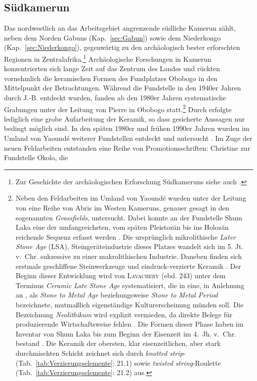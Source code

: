 \subsection{Südkamerun}\label{sec:Kamerun}

Das nordwestlich an das Arbeitsgebiet angrenzende südliche Kamerun zählt, neben dem Norden Gabuns (Kap.~\ref{sec:Gabun}) sowie dem Niederkongo (Kap.~\ref{sec:Niederkongo}), gegenwärtig zu den archäologisch bester erforschten Regionen in Zentralafrika.\footnote{Zur Geschichte der archäologischen Erforschung Südkameruns siehe auch \textcite[7--9]{Seidensticker.2010b}.} Archäologische Forschungen in Kamerun konzentrierten sich lange Zeit auf das Zentrum des Landes und rückten vornehmlich die keramischen Formen des Fundplatzes Obobogo in den Mittelpunkt der Betrachtungen. Während die Fundstelle in den 1940er Jahren durch \mbox{J.-B.} \textcites{Jauze.1944}{Jauze.1944b}{Jauze.1948} entdeckt wurden, fanden ab den 1980er Jahren systematische Grabungen unter der Leitung von \mbox{Pierre} \textcites{Maret.1980}{Maret.1982} in Obobogo statt.\footnote{Neben den Feldarbeiten im Umland von Yaoundé wurden unter der Leitung von \textcites{deMaret.1995}{Maret.1996} eine Reihe von Abris im Westen Kameruns, genauer gesagt in den sogenannten \textit{Grassfields}, untersucht. Dabei konnte an der Fundstelle Shum Laka eine der umfangreichsten, vom späten Pleistozän bis ins Holozän reichende Sequenz erfasst werden \parencites{Asombang.1988}{Asombang.1992}{deMaret.1995}{Maret.1996}{Lavachery.1996}{Moeyersons.1996}{Cornelissen.1996}{Cornelissen.2003}. Die ursprünglich mikrolithische \textit{Later Stone Age} (LSA), Steingeräteindustrie dieses Platzes wandelt sich im 5. Jt. v.~Chr. sukzessive zu einer makrolithischen Industrie. Daneben finden sich erstmals geschliffene Steinwerkzeuge und eindruck-verzierte Keramik \parencite[225, 243]{Lavachery.2001}. Der Beginn dieser Entwicklung wird von \textsc{Lavachery} (ebd. 243) unter dem Terminus \textit{Ceramic Late Stone Age} systematisiert, die in eine, in Anlehnung an \textcite{McIntosh.1988}, als \textit{Stone to Metal Age} \parencite[SMA;][213]{Lavachery.2001} beziehungsweise \textit{Stone to Metal Period} \parencite[SMP;][279]{Maret.1996} bezeichnete, mutmaßlich eigenständige Kulturerscheinung münden soll. Die Bezeichnung \textit{Neolithikum} wird explizit vermieden, da direkte Belege für produzierende Wirtschaftsweise fehlen \parencite[243]{Lavachery.2001}. Die Formen dieser Phase haben im Inventar von Shum Laka bis zum Beginn der Eisenzeit im 4.~Jh. v.~Chr. bestand \parencite[278]{Maret.1996}. Die Keramik der obersten, klar eisenzeitlichen, aber stark durchmischten Schicht zeichnet sich durch \textit{knotted strip}- (Tab.~\ref{tab:Verzierungselemente}: 21.1) sowie \textit{twisted string}-Roulette (Tab.~\ref{tab:Verzierungselemente}: 21.2) aus.\label{ftn:ShumLaka}} Durch \textcite{Claes.1985} erfolgte lediglich eine grobe Aufarbeitung der Keramik, so dass gesicherte Aussagen nur bedingt möglich sind. In den späten 1980er und frühen 1990er Jahren  wurden im Umland von Yaoundé weiterer Fundstellen entdeckt und untersucht \parencite{Essomba.1989}. Im Zuge der neuen Feldarbeiten entstanden eine Reihe von Promotionsschriften: Christine \textcite{Atangana.1988} zur Fundstelle Okolo, die 